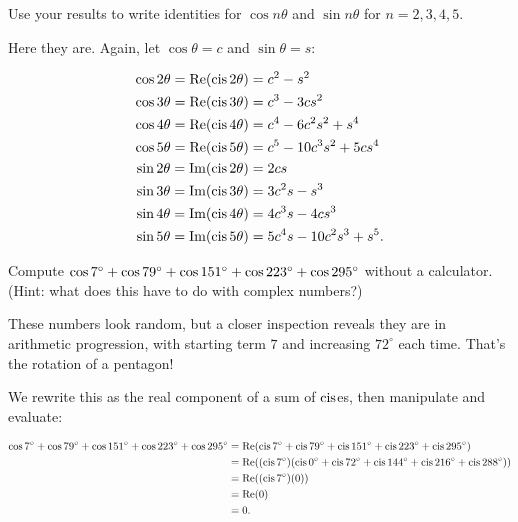 \documentclass[../key.tex]{subfiles}
\begin{document}
\begin{inner_problem}
\item Use your results to write identities for $\cos n\theta$ and $\sin n\theta$ for $n=2,3,4,5$.
\end{inner_problem}

Here they are. Again, let $\cos\theta = c$ and $\sin\theta = s$:

\begin{align*}
\cos 2\theta = \operatorname{Re}(\operatorname{cis} 2\theta) &= c^2 - s^2 \\
\cos 3\theta = \operatorname{Re}(\operatorname{cis} 3\theta) &= c^3 - 3cs^2 \\
\cos 4\theta = \operatorname{Re}(\operatorname{cis} 4\theta) &= c^4 - 6c^2s^2 + s^4 \\
\cos 5\theta = \operatorname{Re}(\operatorname{cis} 5\theta) &= c^5 - 10c^3s^2 + 5cs^4 \\
\sin 2\theta = \operatorname{Im}(\operatorname{cis} 2\theta) &= 2cs \\
\sin 3\theta = \operatorname{Im}(\operatorname{cis} 3\theta) &= 3c^2s - s^3 \\
\sin 4\theta = \operatorname{Im}(\operatorname{cis} 4\theta) &= 4c^3s - 4cs^3 \\
\sin 5\theta = \operatorname{Im}(\operatorname{cis} 5\theta) &= 5c^4s - 10c^2s^3 + s^5. \\
\end{align*}

\begin{outer_problem}
\item Compute $\cos 7^\circ + \cos 79^\circ + \cos 151^\circ + \cos 223^\circ + \cos 295^\circ$ without a calculator. (Hint: what does this have to do with complex numbers?)
\end{outer_problem}

These numbers look random, but a closer inspection reveals they are in arithmetic progression, with starting term $7$ and increasing $72^\circ$ each time. That's the rotation of a pentagon!

We rewrite this as the real component of a sum of $\operatorname{cis}$es, then manipulate and evaluate:

\begin{align*}
\cos 7^\circ + \cos 79^\circ + \cos 151^\circ + \cos 223^\circ + \cos 295^\circ &= \operatorname{Re}(\operatorname{cis} 7^\circ + \operatorname{cis} 79^\circ +  \operatorname{cis} 151^\circ +  \operatorname{cis} 223^\circ +  \operatorname{cis} 295^\circ) \\
&= \operatorname{Re}((\operatorname{cis} 7^\circ)(\operatorname{cis} 0^\circ + \operatorname{cis} 72^\circ + \operatorname{cis} 144^\circ + \operatorname{cis} 216^\circ + \operatorname{cis} 288^\circ)) \\
&= \operatorname{Re}((\operatorname{cis} 7^\circ)(0)) \\
&= \operatorname{Re}(0) \\
&= 0.
\end{align*}
\end{document}
